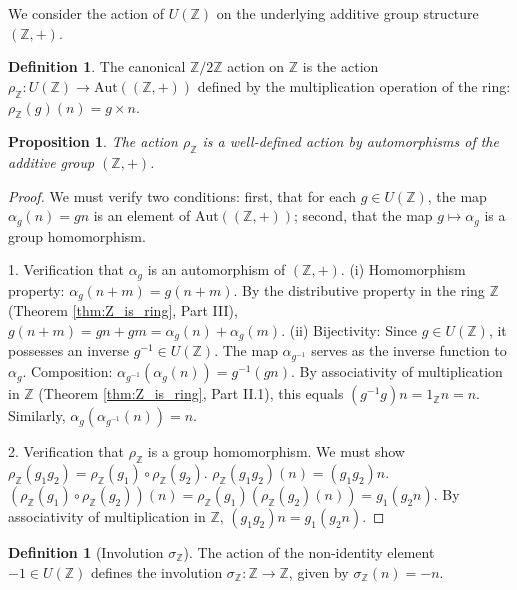 \documentclass[11pt, a4paper]{article}
\theoremstyle{plain}
\newtheorem{proposition}[theorem]{Proposition}
\theoremstyle{definition}
\newtheorem{definition}[theorem]{Definition}
\numberwithin{equation}{section}
\newcommand{\Z}{\mathbb{Z}}
\newcommand{\Ztwo}{\mathbb{Z}/2\mathbb{Z}}
\newcommand{\Aut}{\mathrm{Aut}}
\begin{document}
We consider the action of $U(\Z)$ on the underlying additive group structure $(\Z, +)$.

\begin{definition}
The canonical $\Ztwo$ action on $\Z$ is the action $\rho_{\Z}: U(\Z) \to \Aut((\Z, +))$ defined by the multiplication operation of the ring: $\rho_{\Z}(g)(n) = g \times n$.
\end{definition}

\begin{proposition}\label{prop:Z_action_additive_automorphism}
The action $\rho_{\Z}$ is a well-defined action by automorphisms of the additive group $(\Z, +)$.
\end{proposition}
\begin{proof}
We must verify two conditions: first, that for each $g \in U(\Z)$, the map $\alpha_g(n) = gn$ is an element of $\Aut((\Z, +))$; second, that the map $g \mapsto \alpha_g$ is a group homomorphism.

1. Verification that $\alpha_g$ is an automorphism of $(\Z, +)$.
(i) Homomorphism property: $\alpha_g(n+m) = g(n+m)$. By the distributive property in the ring $\Z$ (Theorem \ref{thm:Z_is_ring}, Part III), $g(n+m)=gn+gm = \alpha_g(n)+\alpha_g(m)$.
(ii) Bijectivity: Since $g \in U(\Z)$, it possesses an inverse $g^{-1} \in U(\Z)$. The map $\alpha_{g^{-1}}$ serves as the inverse function to $\alpha_g$.
Composition: $\alpha_{g^{-1}}(\alpha_g(n)) = g^{-1}(gn)$. By associativity of multiplication in $\Z$ (Theorem \ref{thm:Z_is_ring}, Part II.1), this equals $(g^{-1}g)n = 1_{\Z}n = n$. Similarly, $\alpha_g(\alpha_{g^{-1}}(n))=n$.

2. Verification that $\rho_{\Z}$ is a group homomorphism.
We must show $\rho_{\Z}(g_1 g_2) = \rho_{\Z}(g_1) \circ \rho_{\Z}(g_2)$.
$\rho_{\Z}(g_1 g_2)(n) = (g_1 g_2)n$.
$(\rho_{\Z}(g_1) \circ \rho_{\Z}(g_2))(n) = \rho_{\Z}(g_1)(\rho_{\Z}(g_2)(n)) = g_1(g_2 n)$.
By associativity of multiplication in $\Z$, $(g_1 g_2)n = g_1(g_2 n)$.
\end{proof}

\begin{definition}[Involution $\sigma_{\Z}$]
The action of the non-identity element $-1 \in U(\Z)$ defines the involution $\sigma_{\Z}: \Z \to \Z$, given by $\sigma_{\Z}(n)=-n$.
\end{definition}
\end{document}
